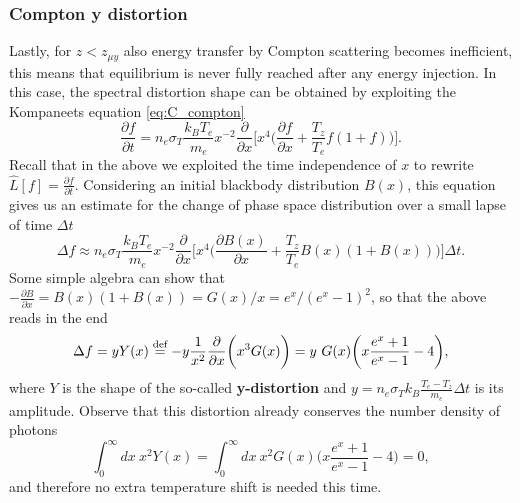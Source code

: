 \subsubsection{Compton y distortion}
Lastly, for $z<z_{\mu y}$ also energy transfer by Compton scattering becomes inefficient, this means that equilibrium is never fully reached after any energy injection. In this case, the spectral distortion shape can be obtained by exploiting the Kompaneets equation \eqref{eq:C_compton}
$$\frac{\partial f}{\partial t}=n_e\sigma_T\frac{k_BT_e}{m_e}x^{-2}\frac{\partial}{\partial x}\bigg[x^4\bigg(\frac{\partial f}{\partial x}+\frac{T_z}{T_e}f(1+f)\bigg)\bigg].$$ Recall that in the above we exploited the time independence of $x$ to rewrite $\hat{L}[f]=\frac{\partial f}{\partial t}.$
Considering an initial blackbody distribution $B(x)$, this equation gives us an estimate for the change of phase space distribution over a small lapse of time $\Delta t$ $$\Delta f\approx n_e\sigma_T\frac{k_BT_e}{m_e}x^{-2}\frac{\partial}{\partial x}\bigg[x^4\bigg(\frac{\partial B(x)}{\partial x}+\frac{T_z}{T_e}B(x)(1+B(x))\bigg)\bigg]\Delta t.$$
Some simple algebra can show that $-\frac{\partial B}{\partial x}=B(x)(1+B(x))={G(x)}/{x}={e^x}/{(e^x-1)^2}$, so that the above reads in the end
\begin{equation}
    \label{eq:SD_y_distortion}
    \Delta f=yY(x)\defeq -y\frac{1}{x^2}\frac{\partial}{\partial x}\bigg(x^3G(x)\bigg)=y\ G(x)\bigg(x\frac{e^x+1}{e^x-1}-4\bigg),
\end{equation}
where $Y$ is the shape of the so-called \textbf{y-distortion} and $y=n_e\sigma_Tk_B\frac{T_e-T_z}{m_e}\Delta t$ is its amplitude. Observe that this distortion already conserves the number density of photons
$$\int_0^\infty dx\ x^2Y(x)=\int_0^\infty dx\ x^2G(x)\bigg(x\frac{e^x+1}{e^x-1}-4\bigg)=0,$$
and therefore no extra temperature shift is needed this time.

